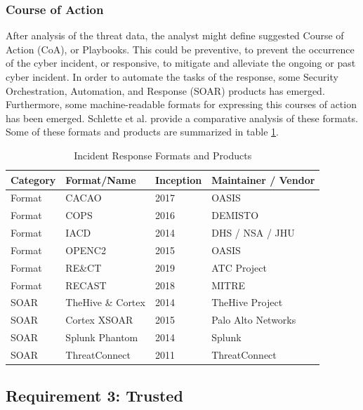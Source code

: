 \subsubsection{Course of Action}
After analysis of the threat data, the analyst might define suggested Course of Action (CoA), or Playbooks. This could be preventive, to prevent the occurrence of the cyber incident, or responsive, to mitigate and alleviate the ongoing or past cyber incident. In order to automate the tasks of the response, some Security Orchestration, Automation, and Response
(SOAR) products has emerged. Furthermore, some machine-readable formats for expressing this courses of action has been emerged. Schlette et al. \cite{schlette_comparative_2021} provide a comparative analysis of these formats. Some of these formats and products are summarized in table \ref{tab:response}.

\begin{table}[ht]
    \begin{tabularx}{\textwidth}{XXXX}
        \hline
        Category & Format/Name & Inception & Maintainer / Vendor \\
        \hline
        \hline
        Format & CACAO & 2017 & OASIS \\
        Format & COPS & 2016 & DEMISTO \\
        Format & IACD & 2014 & DHS / NSA / JHU \\
        Format & OPENC2 & 2015 & OASIS \\
        Format & RE\&CT & 2019 & ATC Project \\
        Format & RECAST & 2018 & MITRE \\
        SOAR & TheHive \& Cortex & 2014 & TheHive Project \\
        SOAR & Cortex XSOAR & 2015 & Palo Alto Networks \\
        SOAR & Splunk Phantom & 2014 & Splunk \\
        SOAR & ThreatConnect & 2011 & ThreatConnect \\
    \end{tabularx}
    \caption{Incident Response Formats and Products \cite{schlette_comparative_2021}}
    \label{tab:response}
\end{table}
    
\subsection{Requirement 3: Trusted}

